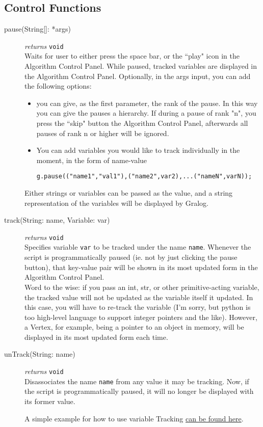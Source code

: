 \documentclass{article}
\newcounter{example}
\begin{document}
\subsection{Control Functions}
\begin{description}


\item[pause(String{[]}: *args)]\emph{returns}
  \texttt{void}\\
Waits for user to either press the space bar, or the ``play" icon in the Algorithm Control Panel. While paused, tracked variables are displayed in the Algorithm Control Panel. Optionally, in the args input, you can add the following options:
\begin{itemize}
    \item you can give, as the first parameter, the rank of the pause. In this way you can give the pauses a hierarchy. If during a pause of rank "n", you press the ``skip" button the Algorithm Control Panel, afterwards all pauses of rank n or higher will be ignored.
    \item You can add variables you would like to track individually in the moment, in the form of name-value \begin{lstlisting}
g.pause(("name1","val1"),("name2",var2),...("nameN",varN));
\end{lstlisting}
\end{itemize}

Either strings or variables can be passed as the value, and a string representation of the variables will be displayed by Gralog.

\item[track(String: name, Variable: var)]\emph{returns}
  \texttt{void}\\
Specifies variable \texttt{var} to be tracked under the name \texttt{name}. Whenever the script is programmatically paused (ie. not by just clicking the pause button), that key-value pair will be shown in its most updated form in the Algorithm Control Panel.\\

Word to the wise: if you pass an int, str, or other primitive-acting variable, the tracked value will not be updated as the variable itself it updated. In this case, you will have to re-track the variable (I'm sorry, but python is too high-level language to support integer pointers and the like). However, a Vertex, for example, being a pointer to an object in memory, will be displayed in its most updated form each time.


\item[unTrack(String: name)]\emph{returns}
  \texttt{void}\\
Disassociates the name \texttt{name} from any value it may be tracking. Now, if the script is programmatically paused, it will no longer be displayed with its former value.




A simple example for how to use variable Tracking \hyperref[varTrackingExample]{can be found here}.

\end{description}
\end{document}
